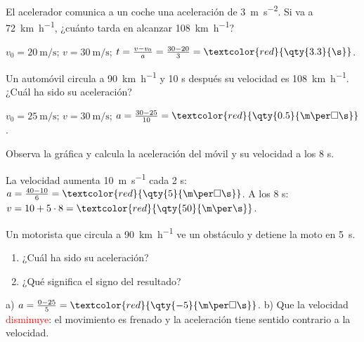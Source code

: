 \begin{exercise}
    El acelerador comunica a un coche una aceleración de \qty{3}{\m\per\square\s}. Si va a \qty{72}{\km\per\hour}, ¿cuánto tarda en alcanzar \qty{108}{\km\per\hour}?
    \begin{solu}
        \(v_0 = \qty{20}{\m\per\s}\); \(v = \qty{30}{\m\per\s}\); \(t = \frac{v - v_0}{a} = \frac{30 - 20}{3} = \textcolor{red}{\qty{3.3}{\s}}\).
    \end{solu}
\end{exercise}

\begin{exercise}
    Un automóvil circula a \qty{90}{\km\per\hour} y 10 s después su velocidad es \qty{108}{\km\per\hour}. ¿Cuál ha sido su aceleración?
    \begin{solu}
        \(v_0 = \qty{25}{\m\per\s}\); \(v = \qty{30}{\m\per\s}\); \(a = \frac{30 - 25}{10} = \textcolor{red}{\qty{0.5}{\m\per\square\s}}\).
    \end{solu}
\end{exercise}

\begin{exercise}
    Observa la gráfica y calcula la aceleración del móvil y su velocidad a los 8 s.
    \begin{center}
    \end{center}
    \begin{solu}
        La velocidad aumenta \qty{10}{\m\per\s} cada 2 s: \(a = \frac{40 - 10}{6} = \textcolor{red}{\qty{5}{\m\per\square\s}}\). A los 8 s: \(v = 10 + 5 \cdot 8 = \textcolor{red}{\qty{50}{\m\per\s}}\).
    \end{solu}
\end{exercise}

\begin{exercise}
    Un motorista que circula a \qty{90}{\km\per\hour} ve un obstáculo y detiene la moto en \qty{5}{\s}.
    \begin{enumerate}[label=\alph*)]
        \item ¿Cuál ha sido su aceleración?
        \item ¿Qué significa el signo del resultado?
    \end{enumerate}
    \begin{solu}
        a) \(a = \frac{0 - 25}{5} = \textcolor{red}{\qty{-5}{\m\per\square\s}}\). b) Que la velocidad \textcolor{red}{disminuye}: el movimiento es frenado y la aceleración tiene sentido contrario a la velocidad.
    \end{solu}
\end{exercise}

